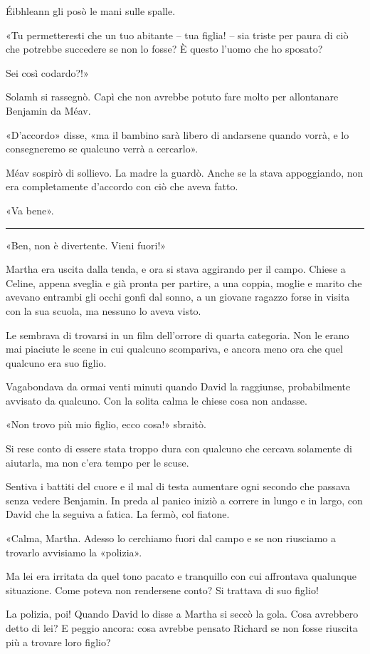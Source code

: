 Éibhleann gli posò le mani sulle spalle.

«Tu permetteresti che un tuo abitante -- tua figlia! -- sia triste per paura di ciò che potrebbe
succedere se non lo fosse? È questo l'uomo che ho sposato?

Sei così codardo?!»

Solamh si rassegnò. Capì che non avrebbe potuto fare molto per allontanare Benjamin da Méav.

«D'accordo» disse, «ma il bambino sarà libero di andarsene quando vorrà, e lo consegneremo se
qualcuno verrà a cercarlo».

Méav sospirò di sollievo. La madre la guardò. Anche se la stava appoggiando, non era completamente
d'accordo con ciò che aveva fatto.

«Va bene».

\plainbreak{1}

«Ben, non è divertente. Vieni fuori!»

Martha era uscita dalla tenda, e ora si stava aggirando per il campo. Chiese a Celine, appena
sveglia e già pronta per partire, a una coppia, moglie e marito che avevano entrambi gli occhi gonfi
dal sonno, a un giovane ragazzo forse in visita con la sua scuola, ma nessuno lo aveva visto.

Le sembrava di trovarsi in un film dell'orrore di quarta categoria. Non le erano mai piaciute le
scene in cui qualcuno scompariva, e ancora meno ora che quel qualcuno era suo figlio.

Vagabondava da ormai venti minuti quando David la raggiunse, probabilmente avvisato da qualcuno. Con
la solita calma le chiese cosa non andasse.

«Non trovo più mio figlio, ecco cosa!» sbraitò.

Si rese conto di essere stata troppo dura con qualcuno che cercava solamente di aiutarla, ma non
c'era tempo per le scuse.

Sentiva i battiti del cuore e il mal di testa aumentare ogni secondo che passava senza vedere
Benjamin. In preda al panico iniziò a correre in lungo e in largo, con David che la seguiva a
fatica. La fermò, col fiatone.

«Calma, Martha. Adesso lo cerchiamo fuori dal campo e se non riusciamo a trovarlo avvisiamo la
«polizia».

Ma lei era irritata da quel tono pacato e tranquillo con cui affrontava qualunque situazione. Come
poteva non rendersene conto? Si trattava di suo figlio!

La polizia, poi! Quando David lo disse a Martha si seccò la gola. Cosa avrebbero detto di lei? E
peggio ancora: cosa avrebbe pensato Richard se non fosse riuscita più a trovare loro figlio?

